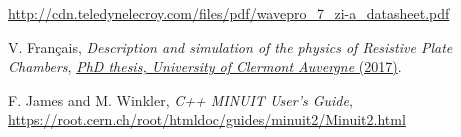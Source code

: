 \documentclass[a4paper,11pt]{article}
\begin{document}
\begin{thebibliography}{99}
 \href{http://cdn.teledynelecroy.com/files/pdf/wavepro_7_zi-a_datasheet.pdf}{http://cdn.teledynelecroy.com/files/pdf/wavepro\_7\_zi-a\_datasheet.pdf}

 V. Fran\c{c}ais, \emph{Description and simulation of the physics of Resistive Plate Chambers},  
 \href{https://tel.archives-ouvertes.fr/tel-01727712}{\emph{PhD thesis, University of Clermont Auvergne} (2017)}. 

 F. James and M. Winkler, \emph{C++ MINUIT User's Guide},
\href{https://root.cern.ch/root/htmldoc/guides/minuit2/Minuit2.html}{https://root.cern.ch/root/htmldoc/guides/minuit2/Minuit2.html}


%


\end{thebibliography}
\end{document}
